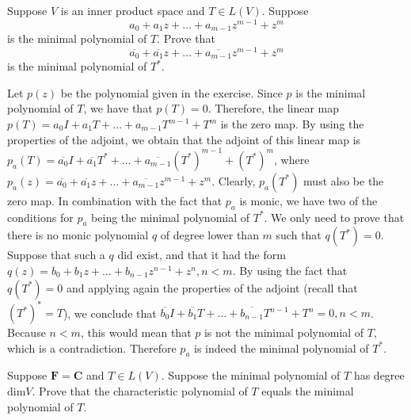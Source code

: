 \begin{exercise}{16}
    Suppose $V$ is an inner product space and $T \in L(V)$. Suppose
    $$a_0 + a_1z + \ldots + a_{m-1}z^{m-1} + z^m$$
    is the minimal polynomial of $T$. Prove that
    $$\overline{a_0} + \overline{a_1}z + \ldots + \overline{a_{m-1}}z^{m-1}+z^m$$
    is the minimal polynomial of $T^*$.
\end{exercise}

\begin{solution}

    Let $p(z)$ be the polynomial given in the exercise. Since $p$ is the minimal polynomial of $T$, we have that $p(T) = 0$. Therefore, the linear map $p(T) = a_0I + a_1T + \ldots + a_{m-1}T^{m-1}+T^m$ is the zero map. By using the properties of the adjoint, we obtain that the adjoint of this linear map is $p_a(T) = \overline{a_0}I + \overline{a_1}T^* + \ldots + \overline{a_{m-1}}(T^*)^{m-1} + (T^*)^m$, where $p_a(z) = \overline{a_0} + \overline{a_1}z + \ldots + \overline{a_{m-1}}z^{m-1} + z^m$. Clearly, $p_a(T^*)$ must also be the zero map. In combination with the fact that $p_a$ is monic, we have two of the conditions for $p_a$ being the minimal polynomial of $T^*$. We only need to prove that there is no monic polynomial $q$ of degree lower than $m$ such that $q(T^*) = 0$. Suppose that such a $q$ did exist, and that it had the form $q(z) = b_0 + b_1z + \ldots + b_{n-1}z^{n-1}+z^n, n < m$. By using the fact that $q(T^*) = 0$ and applying again the properties of the adjoint (recall that $(T^*)^* = T$), we conclude that $\overline{b_0}I + \overline{b_1}T + \ldots + \overline{b_{n-1}}T^{n-1} + T^n = 0, n < m$. Because $n < m$, this would mean that $p$ is not the minimal polynomial of $T$, which is a contradiction. Therefore $p_a$ is indeed the minimal polynomial of $T^*$.
\end{solution}

\begin{exercise}{17}
    Suppose $\mathbf{F} = \mathbf{C}$ and $T \in L(V)$. Suppose the minimal polynomial of $T$ has degree $\text{dim} V$. Prove that the characteristic polynomial of $T$ equals the minimal polynomial of $T$.
\end{exercise}

